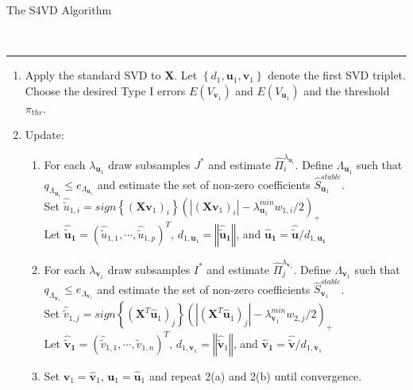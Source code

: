 \begin{bf}The S4VD Algorithm\end{bf}\\
\hspace{-0.1cm} 
\rule{14.75 cm}{1pt}
\begin{enumerate}
 \item Apply the standard SVD to $\mathbf{X}$. Let $\left\{ d_{1}, \mathbf{u}_{1}, \mathbf{v}_{1} \right\}$ denote the first SVD triplet. Choose the desired Type I errors $E(V_{\mathbf{v}_{1}})$ and $E(V_{\mathbf{u}_{1}})$ and the threshold $\pi_{thr}$.
 \item Update:
  \begin{enumerate}
   \item For each $\lambda_{\mathbf{u}_{1}}$ draw subsamples $J^{*}$ and estimate $\hat{\Pi}_{i}^{\lambda_{\mathbf{u}_{1}}}$.
	 Define $\Lambda_{\mathbf{u}_{1}}$ such that $q_{\Lambda_{\mathbf{u}_{1}}} \leq e_{\Lambda_{\mathbf{u}_{1}}}$ and estimate the set of non-zero coefficients
	 $\hat{S}_{\mathbf{u}_{1}}^{stable}$.\\
	 Set $\hat{\tilde{u}}_{1,i}=\textit{sign} \left\{(\mathbf{X}\mathbf{v}_{1})_{i} \right\} (|(\mathbf{X}\mathbf{v}_{1})_{i}|- \lambda^{min}_{\mathbf{u}_{1}}w_{1,i}/2)_{+} $ \\
	 Let $\mathbf{\hat{\tilde{u}}_{1}}=(\hat{\tilde{u}}_{1,1},\cdots,\hat{\tilde{u}}_{1,p})^{T}$,
	 $d_{1,\mathbf{u}_{1}}=\left\Vert \mathbf{\hat{\tilde{u}}_{1}} \right\Vert$, 
	 and $\mathbf{\hat{u}_{1}} =\mathbf{\hat{\tilde{u}}}/d_{1,\mathbf{u_{1}}}$
    \item 
	 For each $\lambda_{\mathbf{v}_{1}}$ draw subsamples $I^{*}$ and estimate $\hat{\Pi}_{j}^{\lambda_{\mathbf{v}_{1}}}$.
	 Define $\Lambda_{\mathbf{v}_{1}}$ such that $q_{\Lambda_{\mathbf{v}_{1}}} \leq e_{\Lambda_{\mathbf{v}_{1}}}$ and estimate
	 the set of non-zero coefficients $\hat{S}_{\mathbf{v}_{1}}^{stable}$. \\
	 Set $\hat{\tilde{v}}_{1,j}= \textit{sign}\left\{(\mathbf{X}^{T}\mathbf{\hat{u}}_{1})_{j}\right\}(|(\mathbf{X}^{T}\mathbf{\hat{u}}_{1})_{j}|-\lambda^{min}_{\mathbf{v}_{1}}w_{2,j}/2)_{+}$ \\
	 Let $\mathbf{\hat{\tilde{v}}_{1}}=(\hat{\tilde{v}}_{1,1},\cdots,\hat{\tilde{v}}_{1,n})^{T}$,
	 $d_{1,\mathbf{v}_{1}}=\left\Vert \mathbf{\hat{\tilde{v}}}_{1} \right\Vert$, 
	 and $\mathbf{\hat{v}_{1}} =\mathbf{\hat{\tilde{v}}}/d_{1,\mathbf{v}_{1}}$
   \item Set $\mathbf{v}_{1}=\mathbf{\hat{v}}_{1}$, $\mathbf{u}_{1}=\mathbf{\hat{u}}_{1}$ and repeat 2(a) and 2(b) until convergence.

\end{enumerate}
\end{enumerate}
